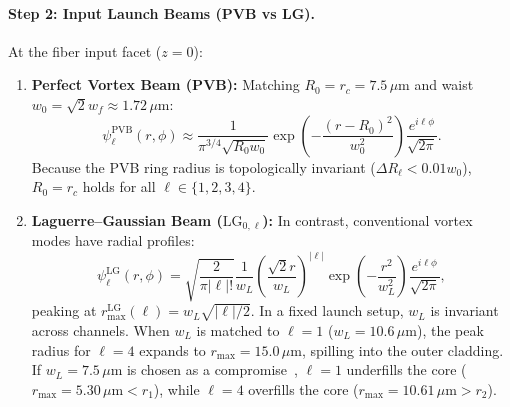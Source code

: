 \documentclass[11pt,a4paper]{article}
\begin{document}
\paragraph{Step 2: Input Launch Beams (PVB vs LG).}
At the fiber input facet ($z = 0$):
\begin{enumerate}
    \item \textbf{Perfect Vortex Beam (PVB):} Matching $R_0 = r_c = 7.5\,\mu\text{m}$ and waist $w_0 = \sqrt{2} w_f \approx 1.72\,\mu\text{m}$:
    \begin{equation}
    \psi_\ell^{\text{PVB}}(r, \phi) \approx \frac{1}{\pi^{3/4} \sqrt{R_0 w_0}} \exp\left( - \frac{(r - R_0)^2}{w_0^2} \right) \frac{e^{i \ell \phi}}{\sqrt{2\pi}}.
    \label{eq:pvb_input}
    \end{equation}
    Because the PVB ring radius is topologically invariant ($\Delta R_\ell < 0.01 w_0$), $R_0 = r_c$ holds for all $\ell \in \{1, 2, 3, 4\}$.
    \item \textbf{Laguerre--Gaussian Beam ($\text{LG}_{0, \ell}$):} In contrast, conventional vortex modes have radial profiles:
    \begin{equation}
    \psi_\ell^{\text{LG}}(r, \phi) = \sqrt{\frac{2}{\pi |\ell|!}} \frac{1}{w_L} \left( \frac{\sqrt{2} r}{w_L} \right)^{|\ell|} \exp\left( - \frac{r^2}{w_L^2} \right) \frac{e^{i \ell \phi}}{\sqrt{2\pi}},
    \label{eq:lg_input}
    \end{equation}
    peaking at $r_{\max}^{\text{LG}}(\ell) = w_L \sqrt{|\ell|/2}$. In a fixed launch setup, $w_L$ is invariant across channels. When $w_L$ is matched to $\ell=1$ ($w_L = 10.6\,\mu\text{m}$), the peak radius for $\ell=4$ expands to $r_{\max} = 15.0\,\mu\text{m}$, spilling into the outer cladding. If $w_L = 7.5\,\mu\text{m}$ is chosen as a compromise~\cite{Villalba2023}, $\ell=1$ underfills the core ($r_{\max} = 5.30\,\mu\text{m} < r_1$), while $\ell=4$ overfills the core ($r_{\max} = 10.61\,\mu\text{m} > r_2$).
\end{enumerate}
\end{document}
